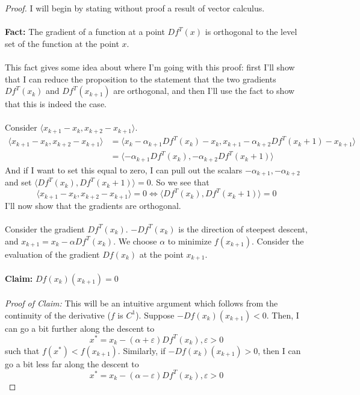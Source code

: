 \documentclass[12pt]{article}
\newenvironment{problem}[2][Problem]{\begin{trivlist}
\item[\hskip \labelsep {\bfseries #1}\hskip \labelsep {\bfseries #2.}]}{\end{trivlist}}
\theoremstyle{definition}
\theoremstyle{definition}
\theoremstyle{definition}
\theoremstyle{definition}
\begin{document}
\begin{problem}{9.5}
\begin{proof}
I will begin by stating without proof a result of vector calculus. \\
\\ 
\textbf{Fact:} The gradient of a function at a point $Df^T(x)$ is orthogonal to the level set of the function at the point $x$. \\
\\
This fact gives some idea about where I'm going with this proof: first I'll show that I can reduce the proposition to the statement that the two gradients $Df^T(x_k)$ and $Df^T(x_{k+1})$ are orthogonal, and then I'll use the fact to show that this is indeed the case. \\
\\
Consider $\langle x_{k+1} - x_{k}, x_{k+2} - x_{k+1} \rangle$.
\begin{align*}
\langle x_{k+1} - x_{k}, x_{k+2} - x_{k+1} \rangle &= \langle x_{k} - \alpha_{k+1} Df^T(x_k) - x_{k}, x_{k+1} - \alpha_{k+2} Df^T(x_k+1) - x_{k+1} \rangle \\
&= \langle -\alpha_{k+1} Df^T(x_k), - \alpha_{k+2} Df^T(x_k+1) \rangle
\end{align*}
And if I want to set this equal to zero, I can pull out the scalars $-\alpha_{k+1}, -\alpha_{k+2}$ and set $\langle Df^T(x_k), Df^T(x_k+1) \rangle = 0$. So we see that 
$$
\langle x_{k+1} - x_{k}, x_{k+2} - x_{k+1} \rangle = 0 \iff \langle Df^T(x_k), Df^T(x_k+1) \rangle = 0
$$ 
I'll now show that the gradients are orthogonal. \\
\\
Consider the gradient $Df^T(x_k)$. $-Df^T(x_k)$ is the direction of steepest descent, and $x_{k+1} = x_k - \alpha Df^T(x_k)$. We choose $\alpha$ to minimize $f(x_{k+1})$. Consider the evaluation of the gradient $Df(x_k)$ at the point $x_{k+1}$. \\
\\
\textbf{Claim:} $Df(x_k)(x_{k+1}) = 0$\\
\\
\textit{Proof of Claim:} This will be an intuitive argument which follows from the continuity of the derivative ($f$ is $C^1$). Suppose $-Df(x_k)(x_{k+1}) < 0$. Then, I can go a bit further along the descent to 
$$x^* = x_k - (\alpha + \varepsilon ) Df^T(x_k), \varepsilon > 0$$
such that $f(x^*) < f(x_{k+1})$. Similarly, if $-Df(x_k)(x_{k+1}) > 0$, then I can go a bit less far along the descent to 
$$x^* = x_k - (\alpha - \varepsilon) Df^T(x_k), \varepsilon > 0$$

\end{proof}
\end{problem}
\end{document}
